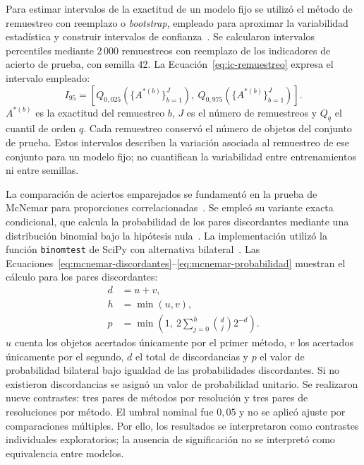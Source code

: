 Para estimar intervalos de la exactitud de un modelo fijo se utilizó el método de remuestreo con reemplazo o \textit{bootstrap}, empleado para aproximar la variabilidad estadística y construir intervalos de confianza~\parencite{efron1986bootstrap}. Se calcularon intervalos percentiles mediante 2\,000 remuestreos con reemplazo de los indicadores de acierto de prueba, con semilla 42. La Ecuación~\eqref{eq:ic-remuestreo} expresa el intervalo empleado:
\begin{equation}\label{eq:ic-remuestreo}
I_{95}=\left[Q_{0{,}025}\!\left(\{A^{*(b)}\}_{b=1}^{J}\right),\ Q_{0{,}975}\!\left(\{A^{*(b)}\}_{b=1}^{J}\right)\right].
\end{equation}
$A^{*(b)}$ es la exactitud del remuestreo $b$, $J$ es el número de remuestreos y $Q_q$ el cuantil de orden $q$. Cada remuestreo conservó el número de objetos del conjunto de prueba. Estos intervalos describen la variación asociada al remuestreo de ese conjunto para un modelo fijo; no cuantifican la variabilidad entre entrenamientos ni entre semillas.

La comparación de aciertos emparejados se fundamentó en la prueba de McNemar para proporciones correlacionadas~\parencite{mcnemar1947}. Se empleó su variante exacta condicional, que calcula la probabilidad de los pares discordantes mediante una distribución binomial bajo la hipótesis nula~\parencite{fagerland2013}. La implementación utilizó la función \texttt{binomtest} de SciPy con alternativa bilateral~\parencite{scipybinom}. Las Ecuaciones~\eqref{eq:mcnemar-discordantes}--\eqref{eq:mcnemar-probabilidad} muestran el cálculo para los pares discordantes:
\begin{subequations}\label{eq:mcnemar-final}
\begin{align}
d&=u+v, \label{eq:mcnemar-discordantes} \\
h&=\min(u,v), \label{eq:mcnemar-minimo} \\
p&=\min\left(1,\ 2\sum_{j=0}^{h}\binom{d}{j}2^{-d}\right). \label{eq:mcnemar-probabilidad}
\end{align}
\end{subequations}
$u$ cuenta los objetos acertados únicamente por el primer método, $v$ los acertados únicamente por el segundo, $d$ el total de discordancias y $p$ el valor de probabilidad bilateral bajo igualdad de las probabilidades discordantes. Si no existieron discordancias se asignó un valor de probabilidad unitario. Se realizaron nueve contrastes: tres pares de métodos por resolución y tres pares de resoluciones por método. El umbral nominal fue $0{,}05$ y no se aplicó ajuste por comparaciones múltiples. Por ello, los resultados se interpretaron como contrastes individuales exploratorios; la ausencia de significación no se interpretó como equivalencia entre modelos.


